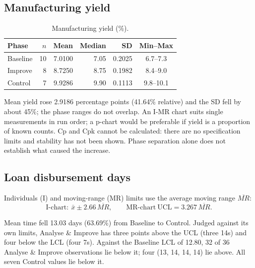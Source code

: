 \documentclass[11pt]{article}
\begin{document}
\subsection{Manufacturing yield}
\begin{table}[!htbp]
\centering\small
\caption{Manufacturing yield (\%).}
\begin{tabular}{@{}lrrrrc@{}}
\toprule
Phase & $n$ & Mean & Median & SD & Min--Max \\
\midrule
Baseline & 10 & 7.0100 & 7.05 & 0.2025 & 6.7--7.3 \\
Improve & 8 & 8.7250 & 8.75 & 0.1982 & 8.4--9.0 \\
Control & 7 & 9.9286 & 9.90 & 0.1113 & 9.8--10.1 \\
\bottomrule
\end{tabular}
\end{table}
Mean yield rose 2.9186 percentage points (41.64\% relative) and the SD fell by about 45\%; the phase ranges do not overlap. An I-MR chart suits single measurements in run order; a p-chart would be preferable if yield is a proportion of known counts. Cp and Cpk cannot be calculated: there are no specification limits and stability has not been shown. Phase separation alone does not establish what caused the increase.

\subsection{Loan disbursement days}
Individuals (I) and moving-range (MR) limits use the average moving range $\overline{MR}$:
\begin{equation}
\mathrm{I\text{-}chart:}\ \bar x\pm2.66\,\overline{MR},\qquad \mathrm{MR\text{-}chart\ UCL}=3.267\,\overline{MR}.
\end{equation}
\begin{table}[!htbp]
\centering\small
\caption{Loan disbursement days with phase-specific I-MR limits.}
\end{table}
Mean time fell 13.03 days (63.69\%) from Baseline to Control. Judged against its own limits, Analyse \& Improve has three points above the UCL (three 14s) and four below the LCL (four 7s). Against the Baseline LCL of 12.80, 32 of 36 Analyse \& Improve observations lie below it; four (13, 14, 14, 14) lie above. All seven Control values lie below it.
\end{document}

